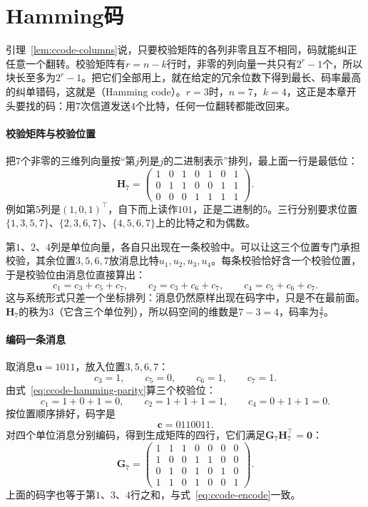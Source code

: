 \section{Hamming码}
\label{sec:ccode-hamming}

引理~\ref{lem:ccode-columns}说，只要校验矩阵的各列非零且互不相同，码就能纠正任意一个翻转。校验矩阵有$r=n-k$行时，非零的列向量一共只有$2^{r}-1$个，所以块长至多为$2^{r}-1$。把它们全部用上，就在给定的冗余位数下得到最长、码率最高的纠单错码，这就是（Hamming code）。$r=3$时，$n=7$，$k=4$，这正是本章开头要找的码：用$7$次信道发送$4$个比特，任何一位翻转都能改回来。

\paragraph{校验矩阵与校验位置}
把$7$个非零的三维列向量按“第$j$列是$j$的二进制表示”排列，最上面一行是最低位：
\begin{equation}
 \bm{H}_7=\begin{pmatrix}
 1&0&1&0&1&0&1\\
 0&1&1&0&0&1&1\\
 0&0&0&1&1&1&1
 \end{pmatrix} .
 \label{eq:ccode-hamming-h}
\end{equation}
例如第$5$列是$(1,0,1)^{\top}$，自下而上读作$101$，正是二进制的$5$。三行分别要求位置$\{1,3,5,7\}$、$\{2,3,6,7\}$、$\{4,5,6,7\}$上的比特之和为偶数。

第$1$、$2$、$4$列是单位向量，各自只出现在一条校验中。可以让这三个位置专门承担校验，其余位置$3,5,6,7$放消息比特$u_1,u_2,u_3,u_4$。每条校验恰好含一个校验位置，于是校验位由消息位直接算出：
\begin{equation}
 c_1=c_3+c_5+c_7,\qquad c_2=c_3+c_6+c_7,\qquad c_4=c_5+c_6+c_7 .
 \label{eq:ccode-hamming-parity}
\end{equation}
这与系统形式只差一个坐标排列：消息仍然原样出现在码字中，只是不在最前面。$\bm{H}_7$的秩为$3$（它含三个单位列），所以码空间的维数是$7-3=4$，码率为$\tfrac47$。

\paragraph{编码一条消息}
取消息$\bm{u}=1011$，放入位置$3,5,6,7$：
\[
 c_3=1,\qquad c_5=0,\qquad c_6=1,\qquad c_7=1 .
\]
由式~\eqref{eq:ccode-hamming-parity}算三个校验位：
\[
 c_1=1+0+1=0,\qquad c_2=1+1+1=1,\qquad c_4=0+1+1=0 .
\]
按位置顺序排好，码字是
\[
 \bm{c}=0110011 .
\]
对四个单位消息分别编码，得到生成矩阵的四行，它们满足$\bm{G}_7\bm{H}_7^{\top}=\bm{0}$：
\[
 \bm{G}_7=\begin{pmatrix}
 1&1&1&0&0&0&0\\
 1&0&0&1&1&0&0\\
 0&1&0&1&0&1&0\\
 1&1&0&1&0&0&1
 \end{pmatrix} .
\]
上面的码字也等于第$1$、$3$、$4$行之和，与式~\eqref{eq:ccode-encode}一致。

